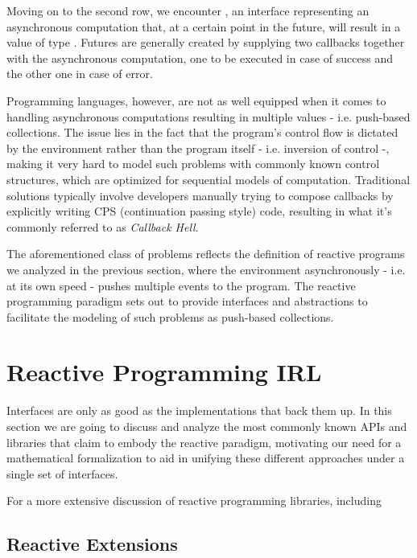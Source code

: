 Moving on to the second row, we encounter , an interface representing an asynchronous computation that, at a certain point in the future, will result in a value of type . Futures are generally created by supplying two callbacks together with the asynchronous computation, one to be executed in case of success and the other one in case of error. 

Programming languages, however, are not as well equipped when it comes to handling asynchronous computations resulting in multiple values - i.e. push-based collections. The issue lies in the fact that the program's control flow is dictated by the environment rather than the program itself - i.e. inversion of control -, making it very hard to model such problems with commonly known control structures, which are optimized for sequential models of computation. Traditional solutions typically involve developers manually trying to compose callbacks by explicitly writing CPS (continuation passing style) code\cite{meijer2015spicing}, resulting in what it's commonly referred to as \textit{Callback Hell}\cite{edwards2009coherent}.

The aforementioned class of problems reflects the definition of reactive programs we analyzed in the previous section, where the environment asynchronously - i.e. at its own speed - pushes multiple events to the program. The reactive programming paradigm sets out to provide interfaces and abstractions to facilitate the modeling of such problems as push-based collections. 

\section{Reactive Programming IRL}

Interfaces are only as good as the implementations that back them up. In this section we are going to discuss and analyze the most commonly known APIs and libraries that claim to embody the reactive paradigm, motivating our need for a mathematical formalization to aid in unifying these different approaches under a single set of interfaces. 

For a more extensive discussion of reactive programming libraries, including 


\subsection{Reactive Extensions}
\label{subsec:rx}

